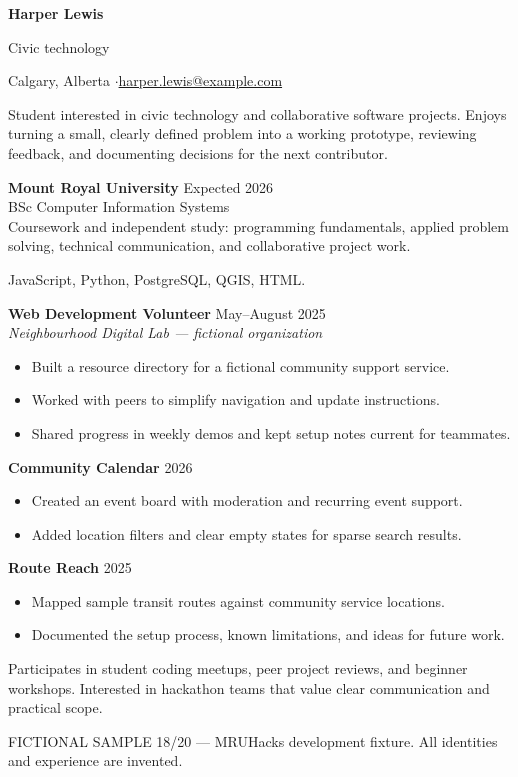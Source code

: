 
{\Huge\bfseries Harper Lewis}\par
{\large\color{accent} Civic technology}\par
Calgary, Alberta \enspace$\cdot$\enspace \href{mailto:harper.lewis@example.com}{harper.lewis@example.com}

Student interested in civic technology and collaborative software projects.
Enjoys turning a small, clearly defined problem into a working prototype,
reviewing feedback, and documenting decisions for the next contributor.

\textbf{Mount Royal University} \hfill Expected 2026\\
BSc Computer Information Systems\\
Coursework and independent study: programming fundamentals, applied problem solving,
technical communication, and collaborative project work.

JavaScript, Python, PostgreSQL, QGIS, HTML.

\textbf{Web Development Volunteer} \hfill May--August 2025\\
\textit{Neighbourhood Digital Lab --- fictional organization}
\begin{itemize}
\item Built a resource directory for a fictional community support service.
\item Worked with peers to simplify navigation and update instructions.
\item Shared progress in weekly demos and kept setup notes current for teammates.
\end{itemize}

\textbf{Community Calendar} \hfill 2026
\begin{itemize}
\item Created an event board with moderation and recurring event support.
\item Added location filters and clear empty states for sparse search results.
\end{itemize}
\textbf{Route Reach} \hfill 2025
\begin{itemize}
\item Mapped sample transit routes against community service locations.
\item Documented the setup process, known limitations, and ideas for future work.
\end{itemize}

Participates in student coding meetups, peer project reviews, and beginner workshops.
Interested in hackathon teams that value clear communication and practical scope.

\vfill
{\footnotesize\color{gray} FICTIONAL SAMPLE 18/20 --- MRUHacks development fixture.
All identities and experience are invented.}

